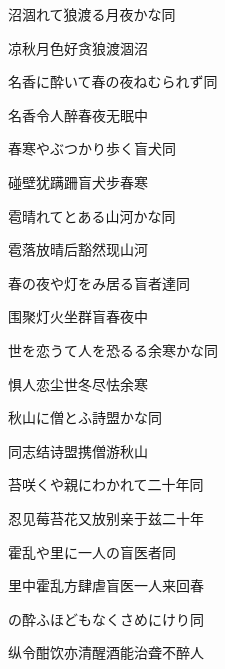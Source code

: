 \begin{haiku}
    {\FH 沼涸れて狼渡る月夜かな}\hfill{\FH 同}

    {\FK 凉秋月色好贪狼渡涸沼}
\end{haiku}

\begin{haiku}
    {\FH 名香に酔いて春の夜ねむられず}\hfill{\FH 同}

    {\FK 名香令人醉春夜无眠中}
\end{haiku}

\begin{haiku}
    {\FH 春寒やぶつかり歩く盲犬}\hfill{\FH 同}

    {\FK 碰壁犹蹒跚盲犬步春寒}
\end{haiku}

\begin{haiku}
    {\FH 雹晴れてとある山河かな}\hfill{\FH 同}

    {\FK 雹落放晴后豁然现山河}
\end{haiku}

\begin{haiku}
    {\FH 春の夜や灯をみ居る盲者達}\hfill{\FH 同}

    {\FK 围聚灯火坐群盲春夜中}
\end{haiku}

\begin{haiku}
    {\FH 世を恋うて人を恐るる余寒かな}\hfill{\FH 同}

    {\FK 惧人恋尘世冬尽怯余寒}
\end{haiku}

\begin{haiku}
    {\FH 秋山に僧とふ詩盟かな}\hfill{\FH 同}

    {\FK 同志结诗盟携僧游秋山}
\end{haiku}

\begin{haiku}
    {\FH 苔咲くや親にわかれて二十年}\hfill{\FH 同}

    {\FK 忍见莓苔花又放别亲于兹二十年}
\end{haiku}

\begin{haiku}
    {\FH 霍乱や里に一人の盲医者}\hfill{\FH 同}

    {\FK 里中霍乱方肆虐盲医一人来回春}
\end{haiku}

\begin{haiku}
    {\FH {}の酔ふほどもなくさめにけり}\hfill{\FH 同}

    {\FK 纵令酣饮亦清醒酒能治聋不醉人}
\end{haiku}

